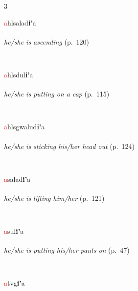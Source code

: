 \documentclass[oneside,openany]{book}%
\begin{document}
\noindent\begin{multicols}{3}%
\begin{minipage}[t]{\linewidth}
\raggedright\noindent \textcolor{Red}{a}hlsalad\textbf{i'}a\\
\\
\noindent \textit{he/she is ascending} (p.~120)
\end{minipage}\\[1em]%
\begin{minipage}[t]{\linewidth}
\raggedright\noindent \textcolor{Red}{a}hlsdul\textbf{i'}a\\
\\
\noindent \textit{he/she is putting on a cap} (p.~115)
\end{minipage}\\[1em]%
\begin{minipage}[t]{\linewidth}
\raggedright\noindent \textcolor{Red}{a}hlsgwalud\textbf{i'}a\\
\\
\noindent \textit{he/she is sticking his/her head out} (p.~124)
\end{minipage}\\[1em]%
\begin{minipage}[t]{\linewidth}
\raggedright\noindent \textcolor{Red}{a}salad\textbf{i'}a\\
\\
\noindent \textit{he/she is lifting him/her} (p.~121)
\end{minipage}\\[1em]%
\begin{minipage}[t]{\linewidth}
\raggedright\noindent \textcolor{Red}{a}sul\textbf{i'}a\\
\\
\noindent \textit{he/she is putting his/her pants on} (p.~47)
\end{minipage}\\[1em]%
\begin{minipage}[t]{\linewidth}
\raggedright\noindent \textcolor{Red}{a}tvg\textbf{i'}a\\
\\

\end{minipage}
\end{multicols}
\end{document}
